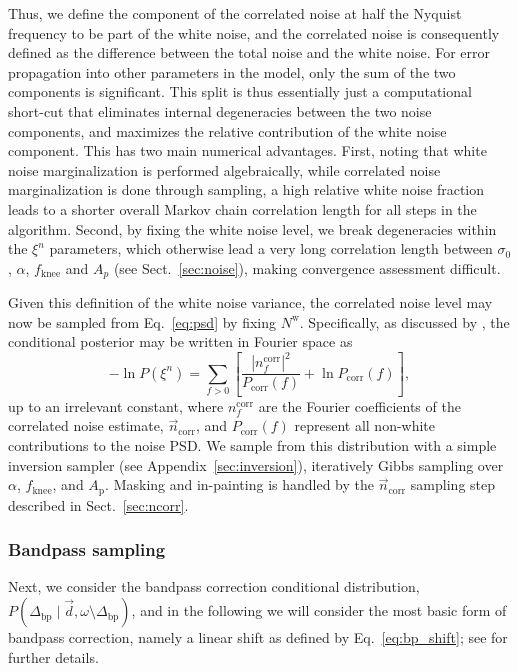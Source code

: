 \documentclass[twocolumn]{aa}
\renewcommand{\d}[0]{\vec{d}}
\newcommand{\n}[0]{\vec{n}}
\begin{document}
Thus, we define the component of the correlated noise at half the
Nyquist frequency to be part of the white noise, and the correlated
noise is consequently defined as the difference between the total
noise and the white noise. For error propagation into other parameters
in the model, only the sum of the two components is significant. This
split is thus essentially just a computational short-cut that
eliminates internal degeneracies between the two noise components, and
maximizes the relative contribution of the white noise component. This
has two main numerical advantages. First, noting that white noise
marginalization is performed algebraically, while correlated noise
marginalization is done through sampling, a high relative white noise
fraction leads to a shorter overall Markov chain correlation length
for all steps in the algorithm. Second, by fixing the white noise
level, we break degeneracies within the $\xi^{n}$ parameters, which
otherwise lead a very long correlation length between $\sigma_0$,
$\alpha$, $f_{\mathrm{knee}}$ and $A_p$ (see Sect.~\ref{sec:noise}),
making convergence assessment difficult.

Given this definition of the white noise variance, the correlated
noise level may now be sampled from Eq.~\eqref{eq:psd} by fixing
$N^{\mathrm{w}}$. Specifically, as discussed by \citet{bp06}, the
conditional posterior may be written in Fourier space as
\begin{equation}
  -\ln P(\xi^n) = \sum_{f>0}
  \left[\frac{|n_f^\mathrm{corr}|^2}{P_{\mathrm{corr}}(f)}
    + \ln{P_{\mathrm{corr}}(f)}\right],
  \label{eq:logP_S}
\end{equation}
up to an irrelevant constant, where $n_f^\mathrm{corr}$ are the
Fourier coefficients of the correlated noise estimate,
$\n_{\mathrm{corr}}$, and $P_{\mathrm{corr}}(f)$ represent all
non-white contributions to the noise PSD. We sample from this
distribution with a simple inversion sampler (see
Appendix~\ref{sec:inversion}), iteratively Gibbs sampling over
$\alpha$, $f_{\mathrm{knee}}$, and $A_\mathrm{p}$. Masking and
in-painting is handled by the $\n_{\mathrm{corr}}$ sampling step
described in Sect.~\ref{sec:ncorr}.

\subsubsection{Bandpass sampling}
\label{sec:bp}  

Next, we consider the bandpass correction conditional distribution,
$P(\Delta_{\mathrm{bp}}\mid \d,\omega\setminus\Delta_{\mathrm{bp}})$,
and in the following we will consider the most basic form of bandpass
correction, namely a linear shift as defined by
Eq.~\eqref{eq:bp_shift}; see \citet{bp09} for further details.
\end{document}

